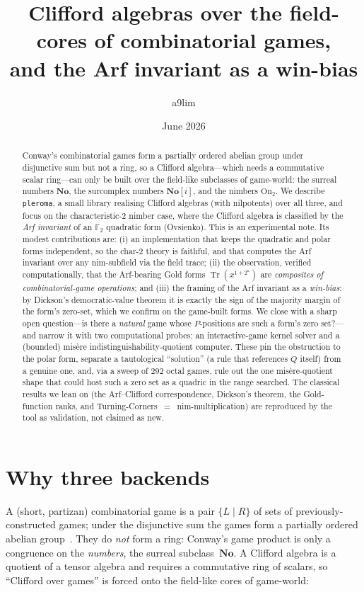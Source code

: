 \documentclass[11pt]{article}
\title{Clifford algebras over the field-cores of combinatorial games,\\
and the Arf invariant as a win-bias}
\author{a9lim}
\date{June 2026}
\theoremstyle{definition}
\newcommand{\No}{\mathbf{No}}
\newcommand{\On}{\mathrm{On}_2}
\newcommand{\F}{\mathbb{F}}
\newcommand{\Tr}{\operatorname{Tr}}
\begin{document}
\maketitle

\begin{abstract}
Conway's combinatorial games form a partially ordered abelian group under
disjunctive sum but not a ring, so a Clifford algebra---which needs a
commutative scalar ring---can only be built over the field-like subclasses of
game-world: the surreal numbers $\No$, the surcomplex numbers $\No[i]$, and the
nimbers $\On$. We describe \texttt{pleroma}, a small library realising Clifford
algebras (with nilpotents) over all three, and focus on the characteristic-$2$
nimber case, where the Clifford algebra is classified by the \emph{Arf
invariant} of an $\F_2$ quadratic form (Ovsienko). This is an experimental note.
Its modest contributions are: (i) an implementation that keeps the quadratic and
polar forms independent, so the char-$2$ theory is faithful, and that computes
the Arf invariant over any nim-subfield via the field trace; (ii) the
observation, verified computationally, that the Arf-bearing Gold forms
$\Tr(x^{1+2^a})$ are \emph{composites of combinatorial-game operations}; and
(iii) the framing of the Arf invariant as a \emph{win-bias}: by Dickson's
democratic-value theorem it is exactly the sign of the majority margin of the
form's zero-set, which we confirm on the game-built forms. We close with a sharp
open question---is there a \emph{natural} game whose $P$-positions are such a
form's zero set?---and narrow it with two computational probes: an
interactive-game kernel solver and a (bounded) misère indistinguishability-quotient
computer. These pin the obstruction to the polar form, separate a tautological
``solution'' (a rule that references $Q$ itself) from a genuine one, and, via a
sweep of $292$ octal games, rule out the one misère-quotient shape that could
host such a zero set as a quadric in the range searched. The classical results we
lean on (the Arf--Clifford correspondence, Dickson's theorem, the Gold-function
ranks, and Turning-Corners~$=$~nim-multiplication) are reproduced by the tool as
validation, not claimed as new.
\end{abstract}

\section{Why three backends}

A (short, partizan) combinatorial game is a pair $\{L \mid R\}$ of sets of
previously-constructed games; under the disjunctive sum the games form a
partially ordered abelian group~\cite{Conway76,WW}. They do \emph{not} form a
ring: Conway's game product is only a congruence on the \emph{numbers}, the
surreal subclass~$\No$. A Clifford algebra is a quotient of a tensor algebra and
requires a commutative ring of scalars, so ``Clifford over games'' is forced
onto the field-like cores of game-world:
\end{document}
